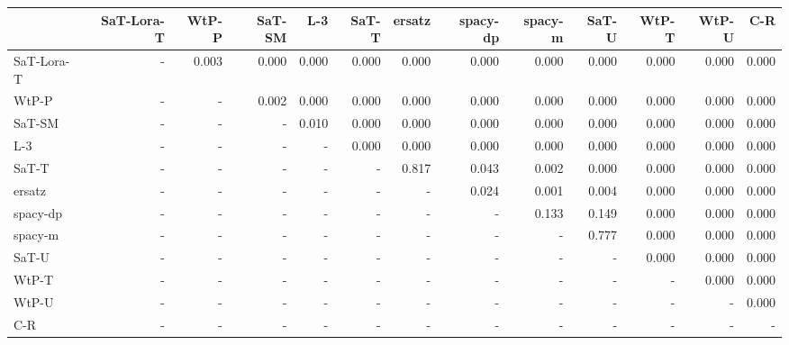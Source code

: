 \begin{tabular}{lrrrrrrrrrrrr}
\toprule
 & SaT-Lora-T & WtP-P & SaT-SM & L-3 & SaT-T & ersatz & spacy-dp & spacy-m & SaT-U & WtP-T & WtP-U & C-R \\
\midrule
SaT-Lora-T & - & 0.003 & 0.000 & 0.000 & 0.000 & 0.000 & 0.000 & 0.000 & 0.000 & 0.000 & 0.000 & 0.000 \\
WtP-P & - & - & 0.002 & 0.000 & 0.000 & 0.000 & 0.000 & 0.000 & 0.000 & 0.000 & 0.000 & 0.000 \\
SaT-SM & - & - & - & 0.010 & 0.000 & 0.000 & 0.000 & 0.000 & 0.000 & 0.000 & 0.000 & 0.000 \\
L-3 & - & - & - & - & 0.000 & 0.000 & 0.000 & 0.000 & 0.000 & 0.000 & 0.000 & 0.000 \\
SaT-T & - & - & - & - & - & 0.817 & 0.043 & 0.002 & 0.000 & 0.000 & 0.000 & 0.000 \\
ersatz & - & - & - & - & - & - & 0.024 & 0.001 & 0.004 & 0.000 & 0.000 & 0.000 \\
spacy-dp & - & - & - & - & - & - & - & 0.133 & 0.149 & 0.000 & 0.000 & 0.000 \\
spacy-m & - & - & - & - & - & - & - & - & 0.777 & 0.000 & 0.000 & 0.000 \\
SaT-U & - & - & - & - & - & - & - & - & - & 0.000 & 0.000 & 0.000 \\
WtP-T & - & - & - & - & - & - & - & - & - & - & 0.000 & 0.000 \\
WtP-U & - & - & - & - & - & - & - & - & - & - & - & 0.000 \\
C-R & - & - & - & - & - & - & - & - & - & - & - & - \\
\bottomrule
\end{tabular}

